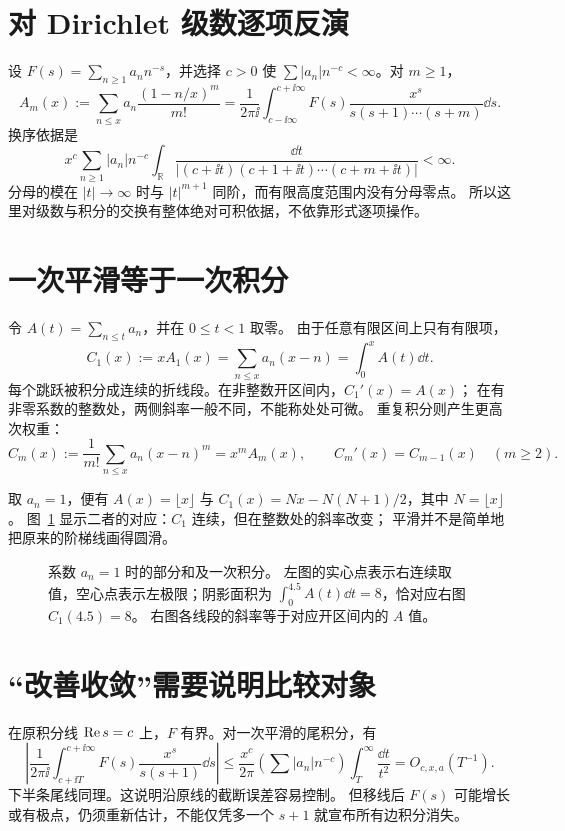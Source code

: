 \documentclass[UTF8,fontset=fandol,11pt]{ctexart}
\begin{document}
\section{对 Dirichlet 级数逐项反演}
设 $F(s)=\sum_{n\ge1}a_nn^{-s}$，并选择 $c>0$ 使
$\sum |a_n|n^{-c}<\infty$。对 $m\ge1$，
\[
 A_m(x):=\sum_{n\le x}a_n\frac{(1-n/x)^m}{m!}
 =\frac1{2\pi\ii}\int_{c-\ii\infty}^{c+\ii\infty}
   F(s)\frac{x^s}{s(s+1)\cdots(s+m)}\dd s.
\]
换序依据是
\[
 x^c\sum_{n\ge1}|a_n|n^{-c}
 \int_{\mathbb R}
 \frac{\dd t}{|(c+\ii t)(c+1+\ii t)\cdots(c+m+\ii t)|}<\infty.
\]
分母的模在 $|t|\to\infty$ 时与 $|t|^{m+1}$ 同阶，而有限高度范围内没有分母零点。
所以这里对级数与积分的交换有整体绝对可积依据，不依靠形式逐项操作。

\section{一次平滑等于一次积分}
令 $A(t)=\sum_{n\le t}a_n$，并在 $0\le t<1$ 取零。
由于任意有限区间上只有有限项，
\[
 C_1(x):=xA_1(x)=\sum_{n\le x}a_n(x-n)
       =\int_0^xA(t)\dd t.
\]
每个跳跃被积分成连续的折线段。在非整数开区间内，$C_1'(x)=A(x)$；
在有非零系数的整数处，两侧斜率一般不同，不能称处处可微。
重复积分则产生更高次权重：
\[
 C_m(x):=\frac1{m!}\sum_{n\le x}a_n(x-n)^m=x^mA_m(x),\qquad
 C_m'(x)=C_{m-1}(x)\quad(m\ge2).
\]

取 $a_n=1$，便有 $A(x)=\lfloor x\rfloor$ 与
$C_1(x)=Nx-N(N+1)/2$，其中 $N=\lfloor x\rfloor$。
图~\ref{fig:smoothing-integral} 显示二者的对应：$C_1$ 连续，但在整数处的斜率改变；
平滑并不是简单地把原来的阶梯线画得圆滑。
\begin{figure}[htbp]
\centering

\caption{系数 $a_n=1$ 时的部分和及一次积分。
左图的实心点表示右连续取值，空心点表示左极限；阴影面积为
$\int_0^{4.5}A(t)\dd t=8$，恰对应右图 $C_1(4.5)=8$。
右图各线段的斜率等于对应开区间内的 $A$ 值。}
\label{fig:smoothing-integral}
\end{figure}

\section{“改善收敛”需要说明比较对象}
在原积分线 $\operatorname{Re} s=c$ 上，$F$ 有界。对一次平滑的尾积分，有
\[
 \left|\frac1{2\pi\ii}\int_{c+\ii T}^{c+\ii\infty}
 F(s)\frac{x^s}{s(s+1)}\dd s\right|
 \le\frac{x^c}{2\pi}
 \left(\sum |a_n|n^{-c}\right)\int_T^\infty\frac{\dd t}{t^2}
 =O_{c,x,a}(T^{-1}).
\]
下半条尾线同理。这说明沿原线的截断误差容易控制。
但移线后 $F(s)$ 可能增长或有极点，仍须重新估计，不能仅凭多一个 $s+1$ 就宣布所有边积分消失。
\end{document}
